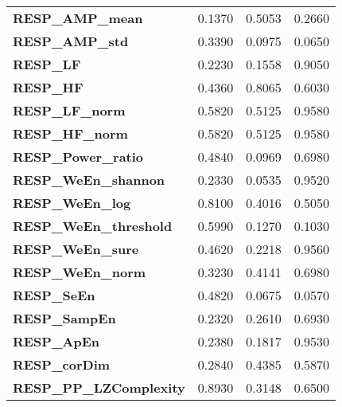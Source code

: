 \begin{footnotesize}
\begin{longtable}[htbp]{m{4.5cm}<{\raggedright}m{3cm}<{\raggedright}m{3cm}<{\raggedright}m{2.2cm}<{\raggedright}}
    { \textbf{RESP\_AMP\_mean}}        & { 0.1370}                     & { 0.5053}                     & { 0.2660}                     \\
    { \textbf{RESP\_AMP\_std}}         & { 0.3390}                     & { 0.0975}                     & { 0.0650}                     \\
    { \textbf{RESP\_LF}}               & { 0.2230}                     & { 0.1558}                     & { 0.9050}                     \\
    { \textbf{RESP\_HF}}               & { 0.4360}                     & { 0.8065}                     & { 0.6030}                     \\
    { \textbf{RESP\_LF\_norm}}         & { 0.5820}                     & { 0.5125}                     & { 0.9580}                     \\
    { \textbf{RESP\_HF\_norm}}         & { 0.5820}                     & { 0.5125}                     & { 0.9580}                     \\
    { \textbf{RESP\_Power\_ratio}}     & { 0.4840}                     & { 0.0969}                     & { 0.6980}                     \\
    { \textbf{RESP\_WeEn\_shannon}}    & { 0.2330}                     & { 0.0535}                     & { 0.9520}                     \\
    { \textbf{RESP\_WeEn\_log}}        & { 0.8100}                     & { 0.4016}                     & { 0.5050}                     \\
    { \textbf{RESP\_WeEn\_threshold}}  & { 0.5990}                     & { 0.1270}                     & { 0.1030}                     \\
    { \textbf{RESP\_WeEn\_sure}}       & { 0.4620}                     & { 0.2218}                     & { 0.9560}                     \\
    { \textbf{RESP\_WeEn\_norm}}       & { 0.3230}                     & { 0.4141}                     & { 0.6980}                     \\
    { \textbf{RESP\_SeEn}}             & { 0.4820}                     & { 0.0675}                     & { 0.0570}                     \\
    { \textbf{RESP\_SampEn}}           & { 0.2320}                     & { 0.2610}                     & { 0.6930}                     \\
    { \textbf{RESP\_ApEn}}             & { 0.2380}                     & { 0.1817}                     & { 0.9530}                     \\
    { \textbf{RESP\_corDim}}           & { 0.2840}                     & { 0.4385}                     & { 0.5870}                     \\
    { \textbf{RESP\_PP\_LZComplexity}} & { 0.8930}                     & {\color[HTML]{333333} 0.3148} & {\color[HTML]{333333} 0.6500}
\end{longtable}
\end{footnotesize}
